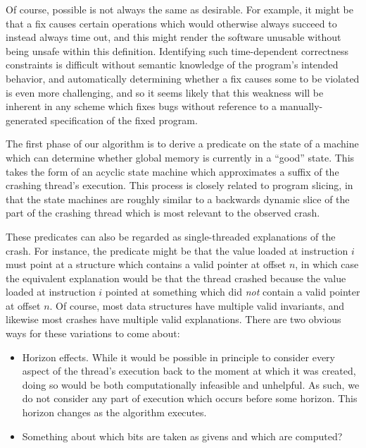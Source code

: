 Of course, possible is not always the same as desirable.  For example,
it might be that a fix causes certain operations which would otherwise
always succeed to instead always time out, and this might render the
software unusable without being unsafe within this definition.
Identifying such time-dependent correctness constraints is difficult
without semantic knowledge of the program's intended behavior, and
automatically determining whether a fix causes some to be violated is
even more challenging, and so it seems likely that this weakness will
be inherent in any scheme which fixes bugs without reference to a
manually-generated specification of the fixed program.


The first phase of our algorithm is to derive a predicate on the state
of a machine which can determine whether global memory is currently in
a ``good'' state.  This takes the form of an acyclic state machine
which approximates a suffix of the crashing thread's execution.  This
process is closely related to program slicing\needCite{}, in that the
state machines are roughly similar to a backwards dynamic slice of the
part of the crashing thread which is most relevant to the observed
crash.

These predicates can also be regarded as single-threaded explanations
of the crash.  For instance, the predicate might be that the value
loaded at instruction $i$ must point at a structure which contains a
valid pointer at offset $n$, in which case the equivalent explanation
would be that the thread crashed because the value loaded at
instruction $i$ pointed at something which did \emph{not} contain a
valid pointer at offset $n$.  Of course, most data structures have
multiple valid invariants, and likewise most crashes have multiple
valid explanations.  There are two obvious ways for these variations
to come about:

\begin{itemize}
\item Horizon effects.  While it would be possible in principle to
  consider every aspect of the thread's execution back to the moment
  at which it was created, doing so would be both computationally
  infeasible and unhelpful.  As such, we do not consider any part of
  execution which occurs before some horizon.  This horizon changes as
  the algorithm executes.
\item Something about which bits are taken as givens and which are
  computed?
\end{itemize}

